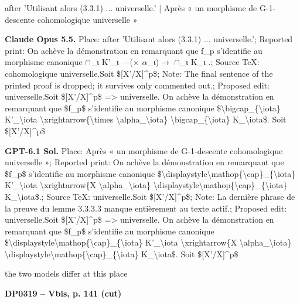 after 'Utilisant alors (3.3.1) ... universelle.' | Après « un morphisme de G-1-descente cohomologique universelle »\par
\textbf{Claude Opus 5.5.} Place: after 'Utilisant alors (3.3.1) ... universelle.'; Reported print: On achève la démonstration en remarquant que f\_p s'identifie au morphisme canonique \ensuremath{\cap}\_ι K'\_ι —(\ensuremath{\times} \ensuremath{\alpha}\_ι)\ensuremath{\to} \ensuremath{\cap}\_ι K\_ι .; Source TeX: cohomologique universelle.Soit \$[X'/X]\textasciicircum{}p\$; Note: The final sentence of the printed proof is dropped; it survives only commented out.; Proposed edit: universelle.Soit \$[X'/X]\textasciicircum{}p\$ =\allowbreak > universelle. On achève la démonstration en remarquant que \$f\_p\$ s'identifie au morphisme canonique \$\textbackslash{}bigcap\_\{\textbackslash{}iota\} K'\_\textbackslash{}iota \textbackslash{}xrightarrow\{\textbackslash{}times \textbackslash{}alpha\_\textbackslash{}iota\} \textbackslash{}bigcap\_\{\textbackslash{}iota\} K\_\textbackslash{}iota\$.  Soit \$[X'/X]\textasciicircum{}p\$\par
\textbf{GPT-6.1 Sol.} Place: Après « un morphisme de G-1-descente cohomologique universelle »; Reported print: On achève la démonstration en remarquant que \$f\_p\$ s'identifie au morphisme canonique \$\textbackslash{}displaystyle\textbackslash{}mathop\{\textbackslash{}cap\}\_\{\textbackslash{}iota\} K'\_\textbackslash{}iota \textbackslash{}xrightarrow\{X \textbackslash{}alpha\_\textbackslash{}iota\} \textbackslash{}displaystyle\textbackslash{}mathop\{\textbackslash{}cap\}\_\{\textbackslash{}iota\} K\_\textbackslash{}iota\$.; Source TeX: universelle.Soit \$[X'/X]\textasciicircum{}p\$; Note: La dernière phrase de la preuve du lemme 3.3.3.3 manque entièrement au texte actif.; Proposed edit: universelle.Soit \$[X'/X]\textasciicircum{}p\$ =\allowbreak > universelle. On achève la démonstration en remarquant que \$f\_p\$ s'identifie au morphisme canonique \$\textbackslash{}displaystyle\textbackslash{}mathop\{\textbackslash{}cap\}\_\{\textbackslash{}iota\} K'\_\textbackslash{}iota \textbackslash{}xrightarrow\{X \textbackslash{}alpha\_\textbackslash{}iota\} \textbackslash{}displaystyle\textbackslash{}mathop\{\textbackslash{}cap\}\_\{\textbackslash{}iota\} K\_\textbackslash{}iota\$.  Soit \$[X'/X]\textasciicircum{}p\$\par
the two models differ at this place\par
\par\noindent\hypertarget{DP0319}{}\textbf{DP0319 -- Vbis, p. 141 (cut)}\par
